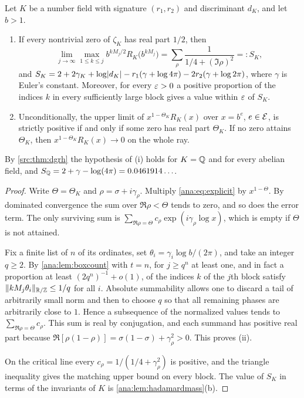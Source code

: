 \begin{theorem}\label{ana:thm:blocks}
Let $K$ be a number field with signature $(r_1,r_2)$ and discriminant $d_K$, and let $b>1$.
\begin{enumerate}[label=\textup{(\roman*)}]
\item If every nontrivial zero of $\zeta_K$ has real part $1/2$, then
 \[
  \lim_{j\to\infty}\max_{1\le k\le j}b^{kM_j/2}R_K\bigl(b^{kM_j}\bigr)
  =\sum_\rho\frac1{1/4+(\Im\rho)^2}=:S_K ,
 \]
 and
 $S_K=2+2\gamma_K+\log\lvert d_K\rvert-r_1(\gamma+\log4\pi)-2r_2(\gamma+\log2\pi)$, where $\gamma$ is
 Euler's constant. Moreover, for every $\varepsilon>0$ a positive proportion of the indices $k$ in
 every sufficiently large block gives a value within $\varepsilon$ of $S_K$.
\item Unconditionally, the upper limit of $x^{1-\Theta_K}R_K(x)$ over $x=b^e$, $e\in\mathcal{E}$, is
 strictly positive if and only if some zero has real part $\Theta_K$. If no zero attains
 $\Theta_K$, then $x^{1-\Theta_K}R_K(x)\to0$ on the whole ray.
\end{enumerate}
\end{theorem}

By \cref{src:thm:dgrh} the hypothesis of (i) holds for $K=\mathbb{Q}$ and for every abelian field, and
$S_{\mathbb{Q}}=2+\gamma-\log(4\pi)=0.0461914\ldots$.

\begin{proof}
Write $\Theta=\Theta_K$ and $\rho=\sigma+i\gamma_\rho$. Multiply \eqref{ana:eq:explicit} by
$x^{1-\Theta}$. By dominated convergence the sum over $\Re\rho<\Theta$ tends to zero, and so
does the error term. The only surviving sum is
$\sum_{\Re\rho=\Theta}c_\rho\exp(i\gamma_\rho\log x)$, which is empty if $\Theta$ is not
attained.

Fix a finite list of $n$ of its ordinates, set $\theta_i=\gamma_i\log b/(2\pi)$, and take an
integer $q\ge2$. By \cref{ana:lem:boxcount} with $t=n$, for $j\ge q^n$ at least one, and in
fact a proportion at least $(2q^n)^{-1}+o(1)$, of the indices $k$ of the $j$th block satisfy
$\lVert kM_j\theta_i\rVert_{\mathbb{R}/\mathbb{Z}}\le1/q$ for all $i$. Absolute summability
allows one to discard a tail of arbitrarily small norm and then to choose $q$ so that all
remaining phases are arbitrarily close to $1$. Hence a subsequence of the normalized values
tends to $\sum_{\Re\rho=\Theta}c_\rho$. This sum is real by conjugation, and each summand has
positive real part because $\Re[\rho(1-\rho)]=\sigma(1-\sigma)+\gamma_\rho^2>0$. This proves
(ii).

On the critical line every $c_\rho=1/(1/4+\gamma_\rho^2)$ is positive, and the triangle
inequality gives the matching upper bound on every block. The value of $S_K$ in terms of the
invariants of $K$ is \cref{ana:lem:hadamardmass}(b).
\end{proof}

